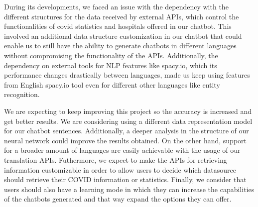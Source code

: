 \documentclass[]{article}
\begin{document}
During its developments, we faced an issue with the dependency with the different structures for the data received by external APIs, which control the functionalities of covid statistics and hospitals offered in our chatbot. This involved an additional data structure customization in our chatbot that could enable us to still have the ability to generate chatbots in different languages without compromising the functionality of the APIs. Additionally, the dependency on external tools for NLP features like spacy.io, which its performance changes drastically between languages, made us keep using features from English spacy.io tool even for different other languages like entity recognition.

We are expecting to keep improving this project so the accuracy is increased and get better results. We are considering using a different data representation model for our chatbot sentences. Additionally, a deeper analysis in the structure of our neural network could improve the results obtained. On the other hand, support for a broader amount of languages are easily achievable with the usage of our translation APIs. Futhermore, we expect to make the APIs for retrieving information customizable in order to allow users to decide which datasource should retrieve their COVID information or statistics. Finally, we consider that users should also have a learning mode in which they can increase the capabilities of the chatbots generated and that way expand the options they can offer.



\end{document}
